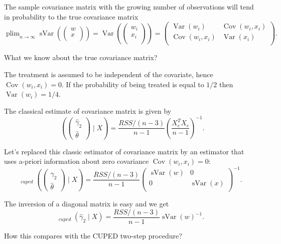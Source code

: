 \documentclass[10pt, a4paper]{article}
\DeclareMathOperator*\plim{plim}
\DeclareMathOperator{\Var}{Var}
\DeclareMathOperator{\sVar}{sVar}
\DeclareMathOperator{\hVar}{\widehat{\Var}}
\DeclareMathOperator{\Cov}{Cov}
\begin{document}
The sample covariance matrix with the growing number of observations will tend in probability to the true 
covariance matrix 
\[
\plim_{n\to\infty} \sVar\left(
    \begin{pmatrix}    
        w \\
        x \\
    \end{pmatrix}
\right) = 
\Var\left(
    \begin{pmatrix}    
        w_i \\
        x_i \\
    \end{pmatrix}
\right) =     \begin{pmatrix}    
    \Var(w_i) & \Cov(w_i, x_i) \\
    \Cov(w_i, x_i) & \Var(x_i) \\
\end{pmatrix}.
\]

What we know about the true covariance matrix?

The treatment is assumed to be independent of the covariate, hence $\Cov(w_i, x_i) = 0$.
If the probability of being treated is equal to $1/2$ then $\Var(w_i) = 1/4$.

The classical estimate of covariance matrix is given by 
\[
\hVar\left( 
    \begin{pmatrix}    
        \hat \gamma_2 \\
        \hat \theta
    \end{pmatrix}
    \mid X \right) = 
\frac{RSS/(n-3)}{n-1} \left(\frac{X_c^TX_c}{n-1}\right)^{-1}.
\]

Let's replaced this classic estimator of covariance matrix by an estimator that uses a-priori information 
about zero covariance $\Cov(w_i, x_i) = 0$:
\[
\hVar_{cuped}\left( 
    \begin{pmatrix}    
        \hat \gamma_2 \\
        \hat \theta
    \end{pmatrix}
    \mid X \right) = 
\frac{RSS/(n-3)}{n-1} 
\begin{pmatrix}
\sVar(w) & 0 \\
0 & \sVar(x) \\
\end{pmatrix}
^{-1}.
\]

The inversion of a diagonal matrix is easy and we get
\[
\hVar_{cuped}(\hat\gamma_2 \mid X) = \frac{RSS/(n-3)}{n-1} \sVar(w)^{-1}.    
\]


How this compares with the CUPED two-step procedure?
\end{document}

